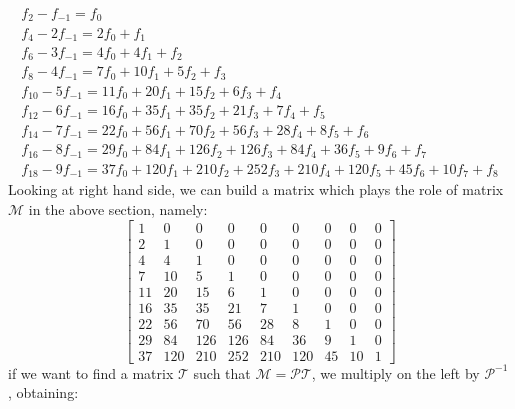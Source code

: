 \begin{displaymath}
    \begin{array}{c}
        f_{2} - f_{-1}= f_{0}\\
        f_{4} -2 f_{-1} = 2 f_{0} + f_{1}\\
        f_{6} -3 f_{-1} = 4 f_{0} + 4 f_{1} + f_{2}\\
        f_{8} -4 f_{-1} = 7 f_{0} + 10 f_{1} + 5 f_{2} + f_{3}\\
        f_{10} -5 f_{-1} = 11 f_{0} + 20 f_{1} + 15 f_{2} + 6 f_{3} + f_{4}\\
        f_{12} -6 f_{-1} = 16 f_{0} + 35 f_{1} + 35 f_{2} + 21 f_{3} + 7 f_{4} + f_{5}\\
        f_{14} -7 f_{-1} = 22 f_{0} + 56 f_{1} + 70 f_{2} + 56 f_{3} + 28 f_{4} + 8 f_{5} + f_{6}\\
        f_{16} -8 f_{-1} = 29 f_{0} + 84 f_{1} + 126 f_{2} + 126 f_{3} + 84 f_{4} + 36 f_{5} + 9 f_{6} + f_{7}\\
        f_{18} -9 f_{-1} = 37 f_{0} + 120 f_{1} + 210 f_{2} + 252 f_{3} + 210 f_{4} + 120 f_{5} + 45 f_{6} + 10 f_{7} + f_{8}
        \end{array}
\end{displaymath}
Looking at right hand side, we can build a matrix which plays the role
of matrix $\mathcal{M}$ in the above section, namely:
\begin{displaymath}
    \left[\begin{array}{ccccccccc}
        1 & 0 & 0 & 0 & 0 & 0 & 0 & 0 & 0\\
        2 & 1 & 0 & 0 & 0 & 0 & 0 & 0 & 0\\
        4 & 4 & 1 & 0 & 0 & 0 & 0 & 0 & 0\\
        7 & 10 & 5 & 1 & 0 & 0 & 0 & 0 & 0\\
        11 & 20 & 15 & 6 & 1 & 0 & 0 & 0 & 0\\
        16 & 35 & 35 & 21 & 7 & 1 & 0 & 0 & 0\\
        22 & 56 & 70 & 56 & 28 & 8 & 1 & 0 & 0\\
        29 & 84 & 126 & 126 & 84 & 36 & 9 & 1 & 0\\
        37 & 120 & 210 & 252 & 210 & 120 & 45 & 10 & 1
        \end{array}\right]
\end{displaymath}
if we want to find a matrix $\mathcal{T}$ such that 
    $\mathcal{M}=\mathcal{P}\mathcal{T}$, we multiply on the left
    by $\mathcal{P}^{-1}$, obtaining:
